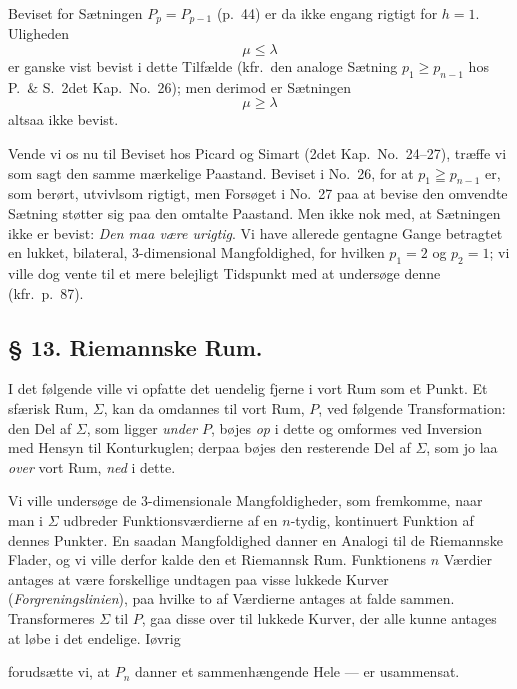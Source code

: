 \documentclass{article}
\begin{document}
Beviset for Sætningen $P_p = P_{p-1}$ (p.\ 44) er da ikke engang rigtigt for $h = 1$. Uligheden
\[
\mu \le \lambda
\]
er ganske vist bevist i dette Tilfælde (kfr.\ den analoge Sætning $p_1 \ge p_{n-1}$ hos P.\ \& S.\ 2det Kap.\ No.\ 26); men derimod er Sætningen
\[
\mu \ge \lambda
\]
altsaa ikke bevist.

Vende vi os nu til Beviset hos Picard og Simart (2det Kap.\ No.\ 24--27), træffe vi som sagt den samme mærkelige Paastand. Beviset i No.\ 26, for at $p_1 \geqq p_{n-1}$ er, som berørt, utvivlsom rigtigt, men Forsøget i No.\ 27 paa at bevise den omvendte Sætning støtter sig paa den omtalte Paastand. Men ikke nok med, at Sætningen ikke er bevist: \emph{Den maa være urigtig}. Vi have allerede gentagne Gange betragtet en lukket, bilateral, 3-dimensional Mangfoldighed, for hvilken $p_1 = 2$ og $p_2 = 1$; vi ville dog vente til et mere belejligt Tidspunkt med at undersøge denne (kfr.\ p.\ 87).

\subsection*{§ 13. Riemannske Rum.}

I det følgende ville vi opfatte det uendelig fjerne i vort Rum som et Punkt. Et sfærisk Rum, $\Sigma$, kan da omdannes til vort Rum, $P$, ved følgende Transformation: den Del af $\Sigma$, som ligger \emph{under} $P$, bøjes \emph{op} i dette og omformes ved Inversion med Hensyn til Konturkuglen; derpaa bøjes den resterende Del af $\Sigma$, som jo laa \emph{over} vort Rum, \emph{ned} i dette.

Vi ville undersøge de 3-dimensionale Mangfoldigheder, som fremkomme, naar man i $\Sigma$ udbreder Funktionsværdierne af en $n$-tydig, kontinuert Funktion af dennes Punkter. En saadan Mangfoldighed danner en Analogi til de Riemannske Flader, og vi ville derfor kalde den et Riemannsk Rum. Funktionens $n$ Værdier antages at være forskellige undtagen paa visse lukkede Kurver (\emph{Forgreningslinien}), paa hvilke to af Værdierne antages at falde sammen. Transformeres $\Sigma$ til $P$, gaa disse over til lukkede Kurver, der alle kunne antages at løbe i det endelige. Iøvrig

forudsætte vi, at $P_n$ danner et sammenhængende Hele --- er usammensat.
\end{document}
